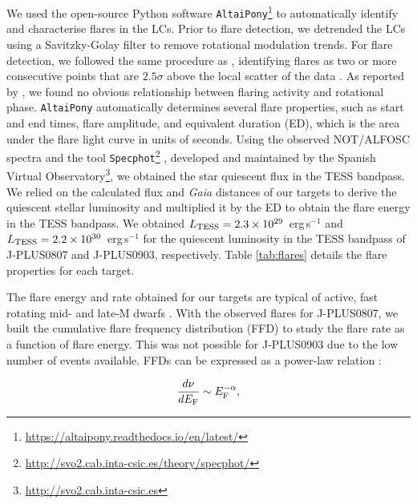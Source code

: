 We used the open-source Python software  \texttt{AltaiPony}\footnote{\url{https://altaipony.readthedocs.io/en/latest/}} \citep{davenport2016,ilin2021} to automatically identify and characterise flares in the LCs. Prior to flare detection, we detrended the LCs using a Savitzky-Golay filter \citep{Savitzky1964} to remove rotational modulation trends. For flare detection, we followed the same procedure as \citet{davenport2014,doyle2019,doyle2022,kumbhakar2023}, identifying flares as two or more consecutive points that are $2.5\sigma$ above the local scatter of the data \citep{chang2015}. As reported by \citet{vida2017,doyle2018}, we found no obvious relationship between flaring activity and rotational phase. \texttt{AltaiPony} automatically determines several flare properties, such as start and end times, flare amplitude, and equivalent duration (ED), which is the area under the flare light curve in units of seconds. Using the observed NOT/ALFOSC spectra and the tool \texttt{Specphot}\footnote{\url{http://svo2.cab.inta-csic.es/theory/specphot/}} \citep{specphot}, developed and maintained by the Spanish Virtual Observatory\footnote{\url{http://svo2.cab.inta-csic.es}}, we obtained the star quiescent flux in the TESS bandpass. We relied on the calculated flux and \textit{Gaia} distances of our targets to derive the quiescent stellar luminosity and multiplied it by the ED to obtain the flare energy in the TESS bandpass. We obtained $L_{\rm TESS}=2.3\times10^{29}$~erg\,s$^{-1}$ and $L_{\rm TESS}=2.2\times10^{30}$~erg\,s$^{-1}$ for the quiescent luminosity in the TESS bandpass of J-PLUS0807 and J-PLUS0903, respectively. Table \ref{tab:flares} details the flare properties for each target.

The flare energy and rate obtained for our targets are typical of active, fast rotating mid- and late-M dwarfs \citep{doyle2019,ramsay2020,stelzer2022}. With the observed flares for J-PLUS0807, we built the cumulative flare frequency distribution (FFD) to study the flare rate as a function of flare energy. This was not possible for J-PLUS0903 due to the low number of events available. FFDs can be expressed as a power-law relation \citep{stelzer2007,lin2019}:

\begin{equation}
    \frac{d \nu}{d E_{\rm F}}\sim E_{\rm F}^{-\alpha},
    \label{eq:ffd}
\end{equation}

